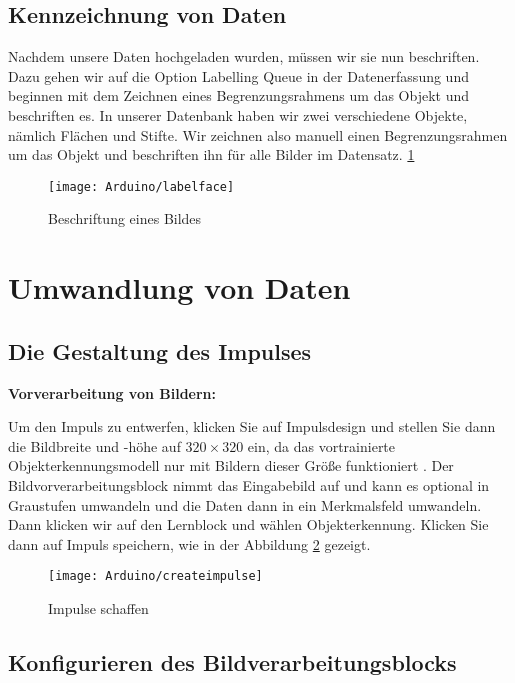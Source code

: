 	\subsection{Kennzeichnung von Daten}
	
	Nachdem unsere Daten hochgeladen wurden, müssen wir sie nun beschriften. Dazu gehen wir auf die Option \glqq Labelling Queue\grqq{} in der Datenerfassung und beginnen mit dem Zeichnen eines Begrenzungsrahmens um das Objekt und beschriften es. In unserer Datenbank haben wir zwei verschiedene Objekte, nämlich Flächen und Stifte. Wir zeichnen also manuell einen Begrenzungsrahmen um das Objekt und beschriften ihn für alle Bilder im Datensatz. \ref{ImageLabelling}
	
	\begin{figure}[H]
		\centering
		\texttt{[image: Arduino/labelface]}
		\caption{Beschriftung eines Bildes }
		\label{ImageLabelling}
	\end{figure}
	
	
	\section{Umwandlung von Daten}
	
	\subsection{Die Gestaltung des Impulses}
	
	\textbf{Vorverarbeitung von Bildern:}
	
	Um den Impuls zu entwerfen, klicken Sie auf Impulsdesign und stellen Sie dann die Bildbreite und -höhe auf $320\times 320$ ein, da das vortrainierte Objekterkennungsmodell nur mit Bildern dieser Größe funktioniert \cite{EdgeImpulse:2021}. Der Bildvorverarbeitungsblock nimmt das Eingabebild auf und kann es optional in Graustufen umwandeln und die Daten dann in ein Merkmalsfeld umwandeln.  Dann klicken wir auf den Lernblock und wählen Objekterkennung. Klicken Sie dann auf Impuls speichern, wie in der Abbildung \ref{EdgeImpulseCreate} gezeigt.
	
	\begin{figure}[H]
		\centering
		\texttt{[image: Arduino/createimpulse]}
		\caption{Impulse schaffen}
		\label{EdgeImpulseCreate}
	\end{figure}
	
	\subsection{Konfigurieren des Bildverarbeitungsblocks} 
	
